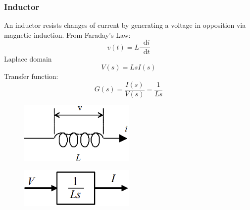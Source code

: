 \documentclass[class=report, crop=false, 12pt,a4paper, tikz, border=4mm]{standalone}
\newcommand{\dif}{\mathop{}\!\mathrm{d}}
\begin{document}
\subsubsection{Inductor}
An inductor resists changes of current by generating a voltage in opposition via magnetic induction. From Faraday's Law:
\begin{equation}
  v(t) = L \frac{\dif i}{\dif t}
\end{equation}
Laplace domain
\begin{equation}
  V(s) = LsI(s)
\end{equation}
Transfer function:
\begin{equation}
  G(s) = \frac{I(s)}{V(s)} = \frac{1}{Ls}
\end{equation}
\begin{figure}[H]
  \centering
  \includegraphics[width = 0.5\textwidth]{../img/diagram7.png}
\end{figure}
\begin{figure}[H]
  \centering
  \includegraphics[width = 0.5\textwidth]{../img/blockdiagram18.png}
\end{figure}
\end{document}

